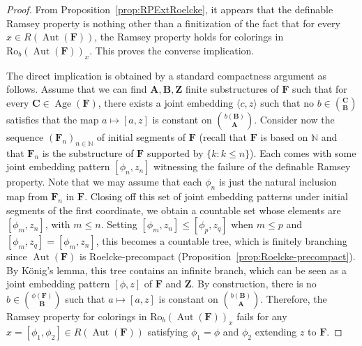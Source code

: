 \documentclass[10pt,a4paper]{article}
\theoremstyle{definition}
\numberwithin{equation}{section}
\numberwithin{figure}{section}
\numberwithin{table}{section}
\newcommand{\N}{\mathbb{N}}
\newcommand*{\mA}{\mathbf{A}}
\newcommand*{\mB}{\mathbf{B}}
\newcommand*{\mC}{\mathbf{C}}
\newcommand*{\mF}{\mathbf{F}}
\newcommand*{\mZ}{\mathbf{Z}}
\DeclareMathOperator{\Aut}{Aut}
\DeclareMathOperator{\Age}{Age}
\newcommand{\ROB}{\mathrm{Ro}_{b}}
\begin{document}
\begin{proof}
From Proposition~\ref{prop:RPExtRoelcke}, it appears that the definable Ramsey property is nothing other than a finitization of the fact that for every $x\in R(\Aut(\mF))$, the Ramsey property holds for colorings in $\ROB(\Aut(\mF))_{x}$. This proves the converse implication.

The direct implication is obtained by a standard compactness argument as follows. Assume that we can find $\mA, \mB, \mZ$ finite substructures of $\mF$ such that for every $\mC\in \Age(\mF)$, there exists a joint embedding $\langle c,z \rangle$ such that no $b\in \binom{\mC}{\mB}$ satisfies that the map $a\mapsto [a,z]$ is constant on $\binom{b(\mB)}{\mA}$. Consider now the sequence $(\mF_{n})_{n\in \N}$ of initial segments of $\mF$ (recall that $\mF$ is based on $\N$ and that $\mF_{n}$ is the substructure of $\mF$ supported by $\{ k : k\leq n\}$). Each comes with some joint embedding pattern $[\phi_{n}, z_{n}]$ witnessing the failure of the definable Ramsey property. Note that we may assume that each $\phi_{n}$ is just the natural inclusion map from $\mF_{n}$ in $\mF$. Closing off this set of joint embedding patterns under initial segments of the first coordinate, we obtain a countable set whose elements are $[\phi_{m}, z_{n}]$, with $m\leq n$. Setting $[\phi_{m}, z_{n}] \leq [\phi_{p}, z_{q}]$ when $m\leq p$ and $[\phi_{m},z_{q}]=[\phi_{m},z_{n}]$, this becomes a countable tree, which is finitely branching since $\Aut(\mF)$ is Roelcke-precompact (Proposition~\ref{prop:Roelcke-precompact}). By K\"onig's lemma, this tree contains an infinite branch, which can be seen as a joint embedding pattern $[\phi, z]$ of $\mF$ and $\mZ$. By construction, there is no $b\in \binom{\phi(\mF)}{\mB}$ such that $a\mapsto [a,z]$ is constant on $\binom{b(\mB)}{\mA}$. Therefore, the Ramsey property for colorings in $\ROB(\Aut(\mF))_{x}$ fails for any $x=[\phi_{1}, \phi_{2}]\in R(\Aut(\mF))$ satisfying $\phi_{1}=\phi$ and $\phi_{2}$ extending $z$ to $\mF$.
\end{proof}
\end{document}
